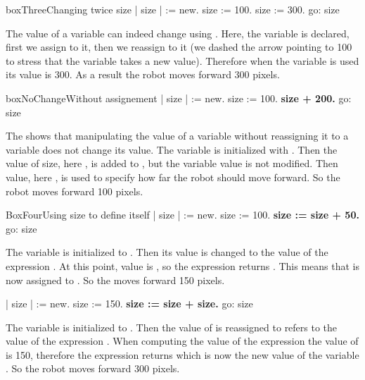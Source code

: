 \begin{scriptfig}[0.45]{boxThree}{Changing twice size}\label{scr:vardeepfour}
| \caro size |		
\caro := \Turtle new.
size := 100.	
size := 300.
\caro go: size 
\end{scriptfig}

The value of a variable can indeed change using \ct{:=}. Here, the variable  is declared, first we assign  to it, then we reassign  to it (we dashed the arrow pointing to 100 to stress that the variable takes a new value). 
Therefore when the variable is used its value is 300. As a result the robot moves forward 300 pixels. 


\begin{scriptfig}[.45]{boxNoChange}{Without assignement}\label{src:nouse}
| size \caro |		
\caro := \Turtle new.
size := 100.	
\textbf{size + 200.}
\caro go: size
\end{scriptfig}

The  shows that manipulating the value of a variable without reassigning it to a variable does not change its value.  The variable  is initialized with . Then the value of size,
here , is added to , but the variable value is not modified. Then  value, here , is used to specify how far the robot should move forward. So the robot moves forward 100 pixels.



\begin{scriptfig}[.45]{BoxFour}{Using size to define itself}\label{scr:vardeepfive}
| \caro size |		
\caro := \Turtle new.
size := 100.	
\textbf{size := size + 50.}
\caro go: size
\end{scriptfig}

The variable  is initialized to . Then its value is changed to the value of the expression . At this point,  value is , so the expression  returns . This means that  is now assigned to . So the \Turtle moves forward 150 pixels.


\begin{scriptwithouttitle}\label{scr:vardeepten}
| \caro size |		
\caro := \Turtle new.
size := 150.	
\textbf{size := size + size.}
\caro go: size 
\end{scriptwithouttitle}

The variable  is initialized to . Then the value of  is reassigned to 
refers to the value of the expression . When computing the value of the expression  the value of  is 150, therefore the expression returns  which is now the new value of the variable . So the robot moves forward 300 pixels.


